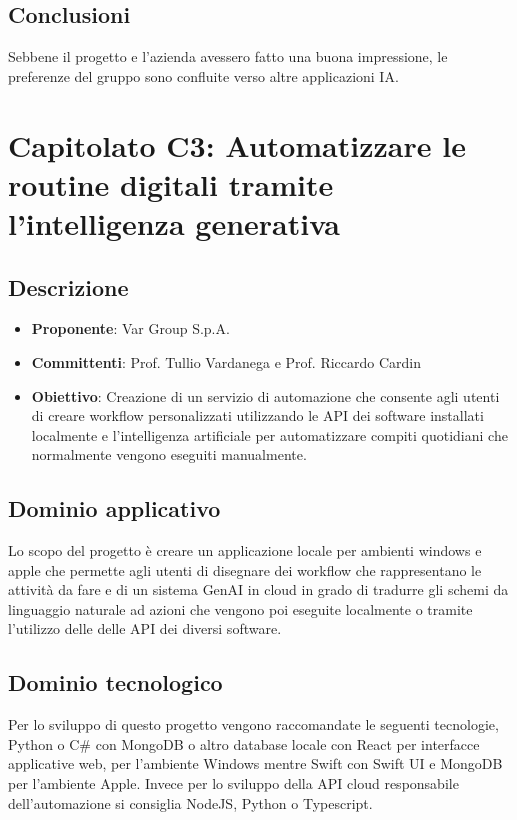 \documentclass[italian, 12pt]{article}
\begin{document}
\subsection{Conclusioni}
Sebbene il progetto e l’azienda avessero fatto una buona impressione, le preferenze del gruppo sono confluite verso altre applicazioni IA.

\section{Capitolato C3: Automatizzare le routine digitali tramite l’intelligenza generativa}
\subsection{Descrizione}
\begin{itemize}
\item\textbf{Proponente}: Var Group S.p.A.
\item\textbf{Committenti}: Prof. Tullio Vardanega e Prof. Riccardo Cardin
\item\textbf{Obiettivo}: Creazione di un servizio di automazione che consente agli utenti di creare workflow personalizzati utilizzando le API dei software installati localmente e l'intelligenza artificiale per automatizzare compiti quotidiani che normalmente vengono eseguiti manualmente.
\end{itemize}

\subsection{Dominio applicativo}
Lo scopo del progetto è creare un applicazione locale per ambienti windows e apple che permette agli utenti di disegnare dei workflow che rappresentano le attività da fare e di un sistema GenAI in cloud in grado di tradurre gli schemi da linguaggio naturale ad azioni che vengono poi eseguite localmente o tramite l'utilizzo delle delle API dei diversi software.

\subsection{Dominio tecnologico}
Per lo sviluppo di questo progetto vengono raccomandate le seguenti tecnologie, Python o C\# con MongoDB o altro database locale con React per interfacce applicative web, per l'ambiente Windows mentre Swift con Swift UI e MongoDB per l'ambiente Apple. Invece per lo sviluppo della API cloud responsabile dell'automazione si consiglia NodeJS, Python o Typescript.
\end{document}
